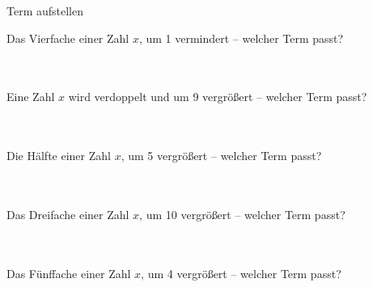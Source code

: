 \setcounter{aufgabe}{6}

\begin{aufgabe}{Term aufstellen}
\begin{teile}
\teil Das Vierfache einer Zahl $x$, um 1 vermindert – welcher Term passt? \\  \\  \\ 
\end{teile}
\begin{teile}
\teil Eine Zahl $x$ wird verdoppelt und um 9 vergrößert – welcher Term passt? \\  \\  \\ 
\end{teile}
\begin{teile}
\teil Die Hälfte einer Zahl $x$, um 5 vergrößert – welcher Term passt? \\  \\  \\ 
\end{teile}
\begin{teile}
\teil Das Dreifache einer Zahl $x$, um 10 vergrößert – welcher Term passt? \\  \\  \\ 
\end{teile}
\begin{teile}
\teil Das Fünffache einer Zahl $x$, um 4 vergrößert – welcher Term passt? \\  \\  \\ 
\end{teile}

\end{aufgabe}
